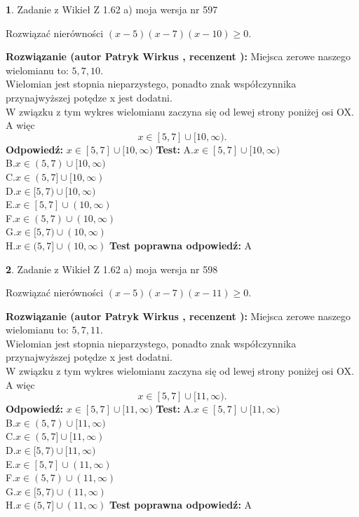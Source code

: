 \documentclass[12pt, a4paper]{article}
\theoremstyle{definition} %
\newtheorem{zad}{}
\newcommand{\zadStart}[1]{\begin{zad}#1\newline}
\newcommand{\zadStop}{\end{zad}}
\newcommand{\rozwStart}[2]{\noindent \textbf{Rozwiązanie (autor #1 , recenzent #2): }\newline}
\newcommand{\rozwStop}{\newline}
\newcommand{\odpStart}{\noindent \textbf{Odpowiedź:}\newline}
\newcommand{\odpStop}{\newline}
\newcommand{\testStart}{\noindent \textbf{Test:}\newline}
\newcommand{\testStop}{\newline}
\newcommand{\kluczStart}{\noindent \textbf{Test poprawna odpowiedź:}\newline}
\newcommand{\kluczStop}{\newline}
\begin{document}
\zadStart{Zadanie z Wikieł Z 1.62 a) moja wersja nr 597}

Rozwiązać nierówności $(x-5)(x-7)(x-10)\ge0$.
\zadStop
\rozwStart{Patryk Wirkus}{}
Miejsca zerowe naszego wielomianu to: $5, 7, 10$.\\
Wielomian jest stopnia nieparzystego, ponadto znak współczynnika przy\linebreak najwyższej potędze x jest dodatni.\\ W związku z tym wykres wielomianu zaczyna się od lewej strony poniżej osi OX. A więc $$x \in [5,7] \cup [10,\infty).$$
\rozwStop
\odpStart
$x \in [5,7] \cup [10,\infty)$
\odpStop
\testStart
A.$x \in [5,7] \cup [10,\infty)$\\
B.$x \in (5,7) \cup [10,\infty)$\\
C.$x \in (5,7] \cup [10,\infty)$\\
D.$x \in [5,7) \cup [10,\infty)$\\
E.$x \in [5,7] \cup (10,\infty)$\\
F.$x \in (5,7) \cup (10,\infty)$\\
G.$x \in [5,7) \cup (10,\infty)$\\
H.$x \in (5,7] \cup (10,\infty)$
\testStop
\kluczStart
A
\kluczStop



\zadStart{Zadanie z Wikieł Z 1.62 a) moja wersja nr 598}

Rozwiązać nierówności $(x-5)(x-7)(x-11)\ge0$.
\zadStop
\rozwStart{Patryk Wirkus}{}
Miejsca zerowe naszego wielomianu to: $5, 7, 11$.\\
Wielomian jest stopnia nieparzystego, ponadto znak współczynnika przy\linebreak najwyższej potędze x jest dodatni.\\ W związku z tym wykres wielomianu zaczyna się od lewej strony poniżej osi OX. A więc $$x \in [5,7] \cup [11,\infty).$$
\rozwStop
\odpStart
$x \in [5,7] \cup [11,\infty)$
\odpStop
\testStart
A.$x \in [5,7] \cup [11,\infty)$\\
B.$x \in (5,7) \cup [11,\infty)$\\
C.$x \in (5,7] \cup [11,\infty)$\\
D.$x \in [5,7) \cup [11,\infty)$\\
E.$x \in [5,7] \cup (11,\infty)$\\
F.$x \in (5,7) \cup (11,\infty)$\\
G.$x \in [5,7) \cup (11,\infty)$\\
H.$x \in (5,7] \cup (11,\infty)$
\testStop
\kluczStart
A
\kluczStop
\end{document}
